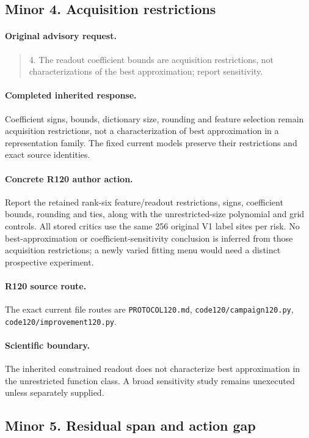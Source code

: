 \subsection{Minor 4. Acquisition restrictions}
\label{response120:minor-4}
\paragraph{Original advisory request.}
\begin{quote}
4. The readout coefficient bounds are acquisition restrictions, not characterizations of the best approximation; report sensitivity.
\end{quote}
\paragraph{Completed inherited response.}
Coefficient signs, bounds, dictionary size, rounding and feature selection remain acquisition restrictions, not a characterization of best approximation in a representation family. The fixed current models preserve their restrictions and exact source identities.
\paragraph{Concrete R120 author action.}
Report the retained rank-six feature/readout restrictions, signs, coefficient bounds, rounding and ties, along with the unrestricted-size polynomial and grid controls. All stored critics use the same 256 original V1 label sites per risk. No best-approximation or coefficient-sensitivity conclusion is inferred from those acquisition restrictions; a newly varied fitting menu would need a distinct prospective experiment.
\paragraph{R120 source route.}
The exact current file routes are \nolinkurl{PROTOCOL120.md}, \nolinkurl{code120/campaign120.py}, \nolinkurl{code120/improvement120.py}.
\paragraph{Scientific boundary.}
The inherited constrained readout does not characterize best approximation in the unrestricted function class. A broad sensitivity study remains unexecuted unless separately supplied.

\subsection{Minor 5. Residual span and action gap}
\label{response120:minor-5}
